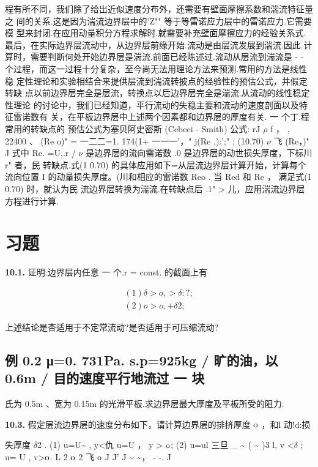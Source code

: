 程有所不同，我们除了给出近似速度分布外，还需要有壁面摩擦系数和湍流特征量之 间的关系.这是因为湍流边界层中的'Z"" 等于等雷诺应力层中的雷诺应力.它需要模 型来封闭.在应用动量积分方程求解时.就需要补充壁面摩擦应力的经验关系式. 最后，在实际边界层流动中，从边界层前缘开始.流动是由层流发展到湍流.因此 计算时，需要判断何处开始边界层是湍流.前面已经陈述过.流动从层流到湍流是 - - 个过程，而这一过程十分复杂，至今尚无法用理论方法来预测.常用的方法是线性稳 定性理论和实验相结合来提供层流到湍流转披点的经验性的预估公式，井假定转缺 点以前边界层完全是层流，转换点以后边界层完全是湍流.从流动的线性稳定性理论 的讨论中，我们已经知道，平行流动的失稳主要和流动的速度剖面以及特征雷诺数有 关，在平板边界层中上述两个因素都和边界层的厚度有关. 一 个丁.程常用的转缺点的 预估公式为塞贝阿史密斯 (Cebeci - Smith) 公式: rJ $\rho$ f ， , 22400 、 (Re o)" = 一二二=1. 174(1+ 一一一'，" j(Re ,):';" ; (10.70) $\nu$ 飞 (Re，)" J 式中 Re. =U,.r / $\nu$ 是边界层的流向需诺数 .0 是边界层的动世损失厚度，下标川 r" 者，民 转缺点.式(1 0.70) 的具体应用如下=从层流边界层计算开始，计算每个流向位置 I 的动量损失厚度。(川和相应的雷诺数 Reo . 当 Red 和 Re ， 满足式(1 0.70) 时，就认为民 流边界层转换为湍流.在转缺点后 .1" > 儿，应用湍流边界层方程进行计算.

\section*{习题}

\noindent\textbf{10.1.} 证明:边界层内任意 一 个.r = const. 的截面上有

\begin{gather*}
(1 )\delta >o,  > \delta :? ;\\
(2) o>o , + \delta 2 ;
\end{gather*}

上述结论是杏适用于不定常流动?是否适用于可压缩流动?

\subsection*{例 0.2  μ=0. 731Pa. s.p=925kg / 旷的油，以 0.6m / 目的速度平行地流过 一 块}

氏为 0.5m 、宽为 0.15m 的光滑平板.求边界层最大厚度及平板所受的阻力.

\noindent\textbf{10.3.} 假定层流边界层的速度分布如下，请计算边界层的排挤厚度 ${\rm o}$ ，和l 动!d:损

失厚度 $\delta$2 . (1) u=U\textasciitilde{} , y<仇 u=U ， y > ${\rm o}$; (2) u=ul 三旦 \_ \textasciitilde{} ( \textasciitilde{} )3 l, v <$\delta$ ; u= U , v>${\rm o}$. L 2 ${\rm o}$ 2 飞 ${\rm o}$ J J' J \textasciitilde{} \textasciitilde{}， - -. J

